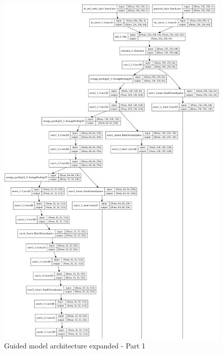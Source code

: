 \documentclass[12pt,openright,oneside,a4paper,english]{abntex2}
\begin{document}
\begin{otherlanguage}{english}
    \begin{figure}[!htb]
    \centering
    \includegraphics[height=\textheight]{model_plot/Guided1}
    \caption{Guided model architecture expanded - Part 1}
    \label{guided_plot_1}
    \end{figure}


\end{otherlanguage}
\end{document}
